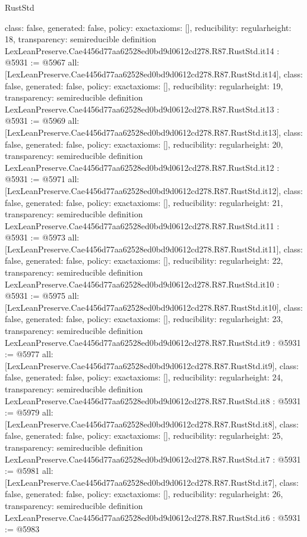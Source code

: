 \begin{lexlean}{RustStd}
\begin{coremodule}
{  class: false,
  generated: false,
  policy: exact{axioms: []},
  reducibility: regular{height: 18},
  transparency: semireducible
}
definition LexLeanPreserve.Cae4456d77aa62528ed0bd9d0612cd278.R87.RustStd.it14 : @5931 := @5967 {
  all: [LexLeanPreserve.Cae4456d77aa62528ed0bd9d0612cd278.R87.RustStd.it14],
  class: false,
  generated: false,
  policy: exact{axioms: []},
  reducibility: regular{height: 19},
  transparency: semireducible
}
definition LexLeanPreserve.Cae4456d77aa62528ed0bd9d0612cd278.R87.RustStd.it13 : @5931 := @5969 {
  all: [LexLeanPreserve.Cae4456d77aa62528ed0bd9d0612cd278.R87.RustStd.it13],
  class: false,
  generated: false,
  policy: exact{axioms: []},
  reducibility: regular{height: 20},
  transparency: semireducible
}
definition LexLeanPreserve.Cae4456d77aa62528ed0bd9d0612cd278.R87.RustStd.it12 : @5931 := @5971 {
  all: [LexLeanPreserve.Cae4456d77aa62528ed0bd9d0612cd278.R87.RustStd.it12],
  class: false,
  generated: false,
  policy: exact{axioms: []},
  reducibility: regular{height: 21},
  transparency: semireducible
}
definition LexLeanPreserve.Cae4456d77aa62528ed0bd9d0612cd278.R87.RustStd.it11 : @5931 := @5973 {
  all: [LexLeanPreserve.Cae4456d77aa62528ed0bd9d0612cd278.R87.RustStd.it11],
  class: false,
  generated: false,
  policy: exact{axioms: []},
  reducibility: regular{height: 22},
  transparency: semireducible
}
definition LexLeanPreserve.Cae4456d77aa62528ed0bd9d0612cd278.R87.RustStd.it10 : @5931 := @5975 {
  all: [LexLeanPreserve.Cae4456d77aa62528ed0bd9d0612cd278.R87.RustStd.it10],
  class: false,
  generated: false,
  policy: exact{axioms: []},
  reducibility: regular{height: 23},
  transparency: semireducible
}
definition LexLeanPreserve.Cae4456d77aa62528ed0bd9d0612cd278.R87.RustStd.it9 : @5931 := @5977 {
  all: [LexLeanPreserve.Cae4456d77aa62528ed0bd9d0612cd278.R87.RustStd.it9],
  class: false,
  generated: false,
  policy: exact{axioms: []},
  reducibility: regular{height: 24},
  transparency: semireducible
}
definition LexLeanPreserve.Cae4456d77aa62528ed0bd9d0612cd278.R87.RustStd.it8 : @5931 := @5979 {
  all: [LexLeanPreserve.Cae4456d77aa62528ed0bd9d0612cd278.R87.RustStd.it8],
  class: false,
  generated: false,
  policy: exact{axioms: []},
  reducibility: regular{height: 25},
  transparency: semireducible
}
definition LexLeanPreserve.Cae4456d77aa62528ed0bd9d0612cd278.R87.RustStd.it7 : @5931 := @5981 {
  all: [LexLeanPreserve.Cae4456d77aa62528ed0bd9d0612cd278.R87.RustStd.it7],
  class: false,
  generated: false,
  policy: exact{axioms: []},
  reducibility: regular{height: 26},
  transparency: semireducible
}
definition LexLeanPreserve.Cae4456d77aa62528ed0bd9d0612cd278.R87.RustStd.it6 : @5931 := @5983 {
}
\end{coremodule}
\end{lexlean}
